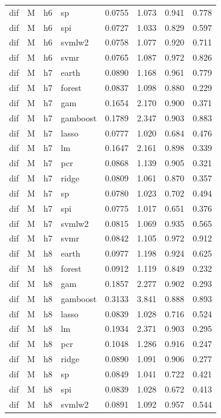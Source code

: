 \begin{ThreePartTable}
\begin{longtable}[t]{llclcccc}
dif & M & h6 & sp & 0.0755 & 1.073 & 0.941 & 0.778\\
dif & M & h6 & spi & 0.0727 & 1.033 & 0.829 & 0.597\\
dif & M & h6 & svmlw2 & 0.0758 & 1.077 & 0.920 & 0.711\\
dif & M & h6 & svmr & 0.0765 & 1.087 & 0.972 & 0.826\\
\addlinespace
dif & M & h7 & earth & 0.0890 & 1.168 & 0.961 & 0.779\\
dif & M & h7 & forest & 0.0837 & 1.098 & 0.880 & 0.229\\
dif & M & h7 & gam & 0.1654 & 2.170 & 0.900 & 0.371\\
dif & M & h7 & gamboost & 0.1789 & 2.347 & 0.903 & 0.883\\
dif & M & h7 & lasso & 0.0777 & 1.020 & 0.684 & 0.476\\
dif & M & h7 & lm & 0.1647 & 2.161 & 0.898 & 0.339\\
dif & M & h7 & pcr & 0.0868 & 1.139 & 0.905 & 0.321\\
dif & M & h7 & ridge & 0.0809 & 1.061 & 0.870 & 0.357\\
dif & M & h7 & sp & 0.0780 & 1.023 & 0.702 & 0.494\\
dif & M & h7 & spi & 0.0775 & 1.017 & 0.651 & 0.376\\
dif & M & h7 & svmlw2 & 0.0815 & 1.069 & 0.935 & 0.565\\
dif & M & h7 & svmr & 0.0842 & 1.105 & 0.972 & 0.912\\
\addlinespace
dif & M & h8 & earth & 0.0977 & 1.198 & 0.924 & 0.625\\
dif & M & h8 & forest & 0.0912 & 1.119 & 0.849 & 0.232\\
dif & M & h8 & gam & 0.1857 & 2.277 & 0.902 & 0.293\\
dif & M & h8 & gamboost & 0.3133 & 3.841 & 0.888 & 0.893\\
dif & M & h8 & lasso & 0.0839 & 1.028 & 0.716 & 0.524\\
dif & M & h8 & lm & 0.1934 & 2.371 & 0.903 & 0.295\\
dif & M & h8 & pcr & 0.1048 & 1.286 & 0.916 & 0.247\\
dif & M & h8 & ridge & 0.0890 & 1.091 & 0.906 & 0.277\\
dif & M & h8 & sp & 0.0849 & 1.041 & 0.722 & 0.421\\
dif & M & h8 & spi & 0.0839 & 1.028 & 0.672 & 0.413\\
dif & M & h8 & svmlw2 & 0.0891 & 1.092 & 0.957 & 0.544\\

\end{longtable}
\end{ThreePartTable}
